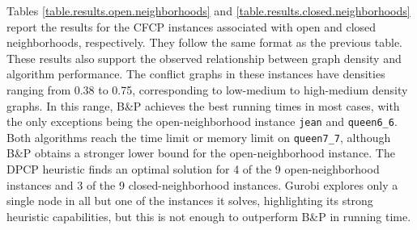 \documentclass[preprint, 11pt, authoryear]{elsarticle}
\begin{document}
Tables \ref{table.results.open.neighborhoods} and \ref{table.results.closed.neighborhoods} report the results for the CFCP instances associated with open and closed neighborhoods, respectively. 
They follow the same format as the previous table.
These results also support the observed relationship between graph density and algorithm performance. 
The conflict graphs in these instances have densities ranging from 0.38 to 0.75, corresponding to low-medium to high-medium density graphs. 
In this range, B\&P achieves the best running times in most cases, with the only exceptions being the open-neighborhood instance \texttt{jean} and \texttt{queen6\_6}. 
Both algorithms reach the time limit or memory limit on \texttt{queen7\_7}, although B\&P obtains a stronger lower bound for the open-neighborhood instance.
The DPCP heuristic finds an optimal solution for 4 of the 9 open-neighborhood instances and 3 of the 9 closed-neighborhood instances.
Gurobi explores only a single node in all but one of the instances it solves, highlighting its strong heuristic capabilities, but this is not enough to outperform B\&P in running time.
\end{document}
